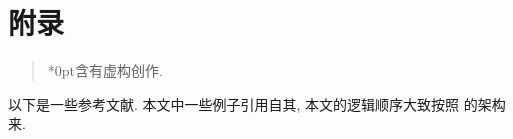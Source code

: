 \section{附\kern\ccwd 录}
\begin{quote}
    *\kern0pt含有虚构创作.
\end{quote}
以下是一些参考文献. 本文中一些例子引用自其, 本文的逻辑顺序大致按照 \cite{Folland99} 的架构来.


\nocite{Folland99,William10,xiadaoxing80,amann05,axler20}
